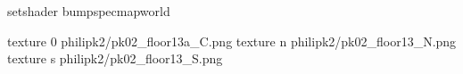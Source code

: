 setshader bumpspecmapworld

texture 0 philipk2/pk02_floor13a_C.png
texture n philipk2/pk02_floor13_N.png
texture s philipk2/pk02_floor13_S.png

